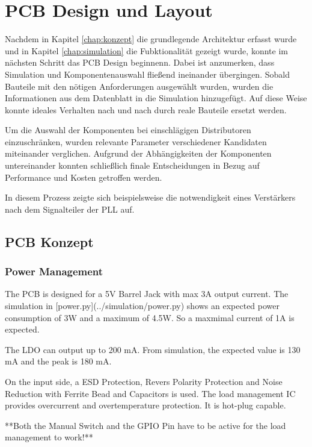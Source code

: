 \chapter{PCB Design und Layout}

Nachdem in Kapitel \ref{chap:konzept} die grundlegende Architektur erfasst wurde und in Kapitel \ref{chap:simulation} die Fubktionalität gezeigt wurde, konnte im nächsten Schritt das PCB Design beginnenn. Dabei ist anzumerken, dass Simulation und Komponentenauswahl fließend ineinander übergingen. Sobald Bauteile mit den nötigen Anforderungen ausgewählt wurden, wurden die Informationen aus dem Datenblatt in die Simulation hinzugefügt. Auf diese Weise konnte ideales Verhalten nach und nach durch reale Bauteile ersetzt werden.

Um die Auswahl der Komponenten bei einschlägigen Distributoren einzuschränken, wurden relevante Parameter verschiedener Kandidaten miteinander verglichen. Aufgrund der Abhängigkeiten der Komponenten untereinander konnten schließlich finale Entscheidungen in Bezug auf Performance und Kosten getroffen werden.

In diesem Prozess zeigte sich beispielsweise die notwendigkeit eines Verstärkers nach dem Signalteiler der PLL auf.

\section{PCB Konzept}

\subsection{Power Management}

The PCB is designed for a 5V Barrel Jack with max 3A output current. The simulation in [power.py](../simulation/power.py) shows an expected power consumption of 3W and a maximum of 4.5W. So a maxmimal current of 1A is expected.

The LDO can output up to 200 mA. From simulation, the expected value is 130 mA and the peak is 180 mA.

On the input side, a ESD Protection, Revers Polarity Protection and Noise Reduction with Ferrite Bead and Capacitors is used.
The load management IC provides overcurrent and overtemperature protection. It is hot-plug capable.

**Both the Manual Switch and the GPIO Pin have to be active for the load management to work!**



